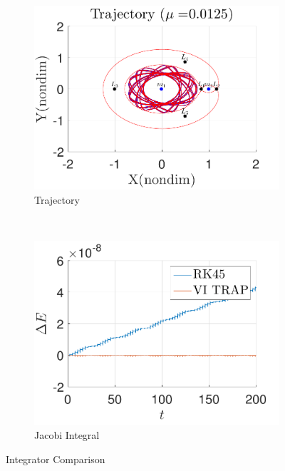 \documentclass[preprint]{elsarticle}
\begin{document}
\begin{figure} 
	\centering 
	\begin{subfigure}[h]{0.5\textwidth} 
		\includegraphics[width=\textwidth]{trajectory} 
		\caption{Trajectory} \label{fig:compare_trajectory} 
	\end{subfigure}~ %
	\begin{subfigure}[htbp]{0.5\textwidth} 
		\includegraphics[width=\textwidth]{energy} 
		\caption{Jacobi Integral} \label{fig:compare_energy} 
	\end{subfigure} 
	\caption{Integrator Comparison}
	\label{fig:integrator_compare} 
\end{figure}
\end{document}

